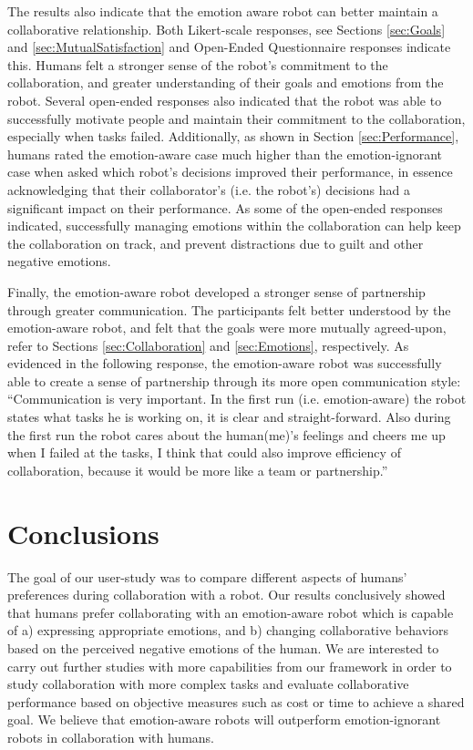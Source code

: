 \documentclass{sig-alternate-05-2015}
\begin{document}
The results also indicate that the emotion aware robot can better maintain a
collaborative relationship. Both Likert-scale responses, see Sections \ref{sec:Goals}
and \ref{sec:MutualSatisfaction} and Open-Ended Questionnaire responses indicate
this. Humans felt a stronger sense of the robot's commitment to the
collaboration, and greater understanding of their goals and emotions from the
robot. Several open-ended responses also indicated that the robot was able to
successfully motivate people and maintain their commitment to the collaboration,
especially when tasks failed. Additionally, as shown in Section \ref{sec:Performance},
humans rated the emotion-aware case much higher than the emotion-ignorant case
when asked which robot's decisions improved their performance, in essence
acknowledging that their collaborator's (i.e. the robot's) decisions had a
significant impact on their performance. As some of the open-ended responses
indicated, successfully managing emotions within the collaboration can help keep
the collaboration on track, and prevent distractions due to guilt and other
negative emotions.

Finally, the emotion-aware robot developed a stronger sense of  partnership
through greater communication. The participants felt better understood by the
emotion-aware robot, and felt that the goals were more mutually agreed-upon,
refer to Sections \ref{sec:Collaboration} and \ref{sec:Emotions}, respectively. As
evidenced in the following response, the emotion-aware robot was successfully
able to create a sense of partnership through its more open communication style:
``Communication is very important. In the first run (i.e. emotion-aware) the
robot states what tasks he is working on, it is clear and straight-forward. Also
during the first run the robot cares about the human(me)'s feelings and cheers
me up when I failed at the tasks, I think that could also improve efficiency of
collaboration, because it would be more like a team or partnership.''

\section{Conclusions}
The goal of our user-study was to compare different aspects of humans'
preferences during collaboration with a robot. Our results conclusively showed
that humans prefer collaborating with an emotion-aware robot which is capable
of a) expressing appropriate emotions, and b) changing collaborative behaviors
based on the perceived negative emotions of the human. We are interested to
carry out further studies with more capabilities from our framework in order to
study collaboration with more complex tasks and evaluate collaborative
performance based on objective measures such as cost or time to achieve a shared
goal. We believe that emotion-aware robots will outperform emotion-ignorant
robots in collaboration with humans.
\end{document}
